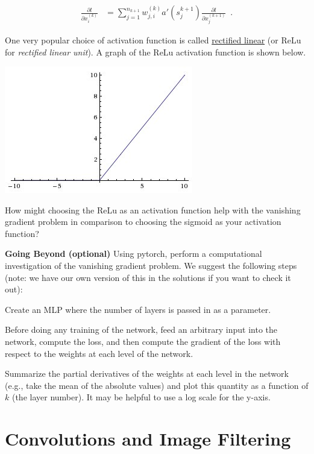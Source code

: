 \documentclass[assignment07_Solutions]{subfiles}
\begin{document}
\begin{exercise}
\begin{align}
\frac{\partial l}{\partial x^{(k)}_i} &= \sum_{j=1}^{n_{k+1}} w^{(k)}_{j,i} a' \left ( s_{j}^{k+1} \right)  \frac{\partial l}{\partial x^{(k+1)}_j} \label{eq:recursion2} \enspace .
\end{align}


One very popular choice of activation function is called \href{https://en.wikipedia.org/wiki/Rectifier_(neural_networks)}{rectified linear} (or ReLu for \emph{rectified linear unit}).  A graph of the ReLu activation function is shown below.

\begin{center}
\includegraphics[width=0.4\linewidth]{figures/relu}
\end{center}

How might choosing the ReLu as an activation function help with the vanishing gradient problem in comparison to choosing the sigmoid as your activation function?

\item \textbf{Going Beyond (optional)} Using pytorch, perform a computational investigation of the vanishing gradient problem.  We suggest the following steps (note: we have our own version of this in the solutions if you want to check it out):
\bi
\item Create an MLP where the number of layers is passed in as a parameter.
\item Before doing any training of the network, feed an arbitrary input into the network, compute the loss, and then compute the gradient of the loss with respect to the weights at each level of the network.
\item Summarize the partial derivatives of the weights at each level in the network (e.g., take the mean of the absolute values) and plot this quantity as a function of $k$ (the layer number).  It may be helpful to use a log scale for the y-axis.
\ei
\ees

\end{exercise}

\section{Convolutions and Image Filtering}
\end{document}
